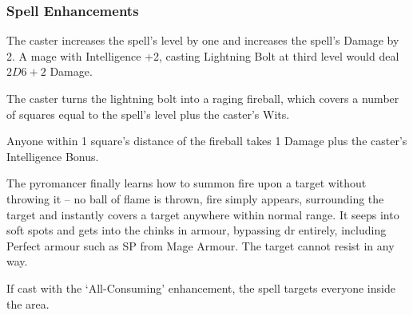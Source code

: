 \begin{multicols}{2}
\subsubsection{Spell Enhancements}

The caster increases the spell's level by one and increases the spell's Damage by 2.  A mage with Intelligence +2, casting Lightning Bolt at third level would deal $2D6+2$ Damage.

The caster turns the lightning bolt into a raging fireball, which covers a number of squares equal to the spell's level plus the caster's Wits.

Anyone within 1 square's distance of the fireball takes 1 Damage plus the caster's Intelligence Bonus.

The pyromancer finally learns how to summon fire upon a target without throwing it -- no ball of flame is thrown, fire simply appears, surrounding the target and instantly covers a target anywhere within normal range. It seeps into soft spots and gets into the chinks in armour, bypassing \gls{dr} entirely, including Perfect armour such as \gls{SP} from Mage Armour. The target cannot resist in any way.

If cast with the `All-Consuming' enhancement, the spell targets everyone inside the area.

\end{multicols}


